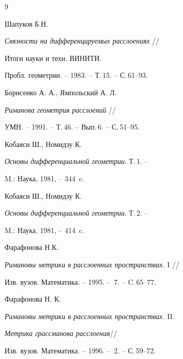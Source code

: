 \begin{thebibliography}{9} 







{Шапуков Б.Н.}


{\em Связности на дифференцируемых расслоениях} //


Итоги науки и техн. ВИНИТИ.


Пробл. геометрии. -- 1983. -- Т.\,15. -- С.\,61--93.







{Борисенко А. А., Ямпольский А. Л.}


{\em Риманова геометрия расслоений} //


УМН. -- 1991. -- Т.\,46. -- Вып.\,6. -- С.\,51--95.







{Кобаяси Ш., Номидзу К.}


{\em Основы дифференциальной геометрии}. Т.\,1. -- 


M.: Наука, 1981, -- 344~c.







{Кобаяси Ш., Номидзу К.}


{\em Основы дифференциальной геометрии}. Т.\,2. -- 


M.: Наука, 1981, -- 414~c.







{Фарафонова Н.К.}


{\em Римановы метрики в расслоенных пространствах.} I //


Изв. вузов. Математика. -- 1995. -- \No\,7. -- C.\,65--77.







{Фарафонова Н. К.}


{\em Римановы метрики в расслоенных пространствах.} II.


{\em Метрика грассманова расслоения}//


Изв. вузов. Математика. -- 1996. -- \No\,2. -- С.\,59--72.





\end{thebibliography} 


 


\vskip 2cm 


 








 


 


